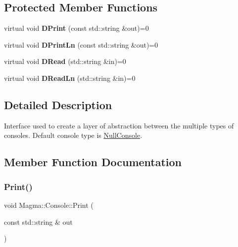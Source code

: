 \subsection*{Protected Member Functions}
\begin{DoxyCompactItemize}
\item 
\mbox{\label{class_magma_1_1_console_a93d5a4745230b85fb5e21c65a4bd1d4f}} 
virtual void {\bfseries D\+Print} (const std\+::string \&out)=0
\item 
\mbox{\label{class_magma_1_1_console_aed105d39eca3a64a54160835206e4a86}} 
virtual void {\bfseries D\+Print\+Ln} (const std\+::string \&out)=0
\item 
\mbox{\label{class_magma_1_1_console_aa36352b1816550648abee51ded18a33f}} 
virtual void {\bfseries D\+Read} (std\+::string \&in)=0
\item 
\mbox{\label{class_magma_1_1_console_a6831d8a7f17a0e5a093f5b9ffd3d56bd}} 
virtual void {\bfseries D\+Read\+Ln} (std\+::string \&in)=0
\end{DoxyCompactItemize}


\subsection{Detailed Description}
Interface used to create a layer of abstraction between the multiple types of consoles. Default console type is \hyperlink{class_magma_1_1_null_console}{Null\+Console}. 



\subsection{Member Function Documentation}
\mbox{\label{class_magma_1_1_console_a86389ac097431a8c5a58b0afa5251a6b}} 
\subsubsection{\texorpdfstring{Print()}{Print()}}
{\footnotesize\ttfamily void Magma\+::\+Console\+::\+Print (\begin{DoxyParamCaption}\item[{const std\+::string \&}]{out }\end{DoxyParamCaption})\hspace{0.3cm}{\ttfamily [static]}}



